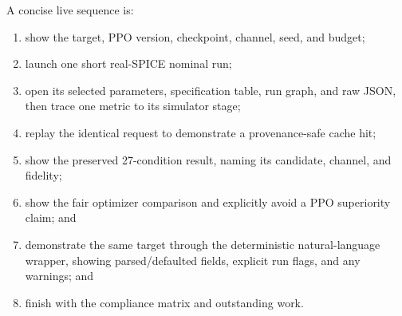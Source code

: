 A concise live sequence is:
\begin{enumerate}
  \item show the target, PPO version, checkpoint, channel, seed, and budget;
  \item launch one short real-SPICE nominal run;
  \item open its selected parameters, specification table, run graph, and raw
        JSON, then trace one metric to its simulator stage;
  \item replay the identical request to demonstrate a provenance-safe cache hit;
  \item show the preserved 27-condition result, naming its candidate, channel,
        and fidelity;
  \item show the fair optimizer comparison and explicitly avoid a PPO
        superiority claim; and
  \item demonstrate the same target through the deterministic natural-language
        wrapper, showing parsed/defaulted fields, explicit run flags, and any
        warnings; and
  \item finish with the compliance matrix and outstanding work.
\end{enumerate}
